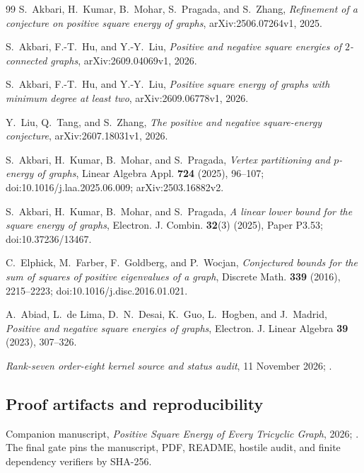 \documentclass[11pt]{article}
\theoremstyle{remark}
\begin{document}
\begin{thebibliography}{99}
S.~Akbari, H.~Kumar, B.~Mohar, S.~Pragada, and S.~Zhang,
\emph{Refinement of a conjecture on positive square energy of graphs},
arXiv:2506.07264v1, 2025.

S.~Akbari, F.-T.~Hu, and Y.-Y.~Liu,
\emph{Positive and negative square energies of $2$-connected graphs},
arXiv:2609.04069v1, 2026.

S.~Akbari, F.-T.~Hu, and Y.-Y.~Liu,
\emph{Positive square energy of graphs with minimum degree at least two},
arXiv:2609.06778v1, 2026.

Y.~Liu, Q.~Tang, and S.~Zhang,
\emph{The positive and negative square-energy conjecture},
arXiv:2607.18031v1, 2026.

S.~Akbari, H.~Kumar, B.~Mohar, and S.~Pragada,
\emph{Vertex partitioning and $p$-energy of graphs},
Linear Algebra Appl. \textbf{724} (2025), 96--107;
doi:10.1016/j.laa.2025.06.009; arXiv:2503.16882v2.

S.~Akbari, H.~Kumar, B.~Mohar, and S.~Pragada,
\emph{A linear lower bound for the square energy of graphs},
Electron. J. Combin. \textbf{32}(3) (2025), Paper P3.53;
doi:10.37236/13467.

C.~Elphick, M.~Farber, F.~Goldberg, and P.~Wocjan,
\emph{Conjectured bounds for the sum of squares of positive eigenvalues of a
graph}, Discrete Math. \textbf{339} (2016), 2215--2223;
doi:10.1016/j.disc.2016.01.021.

A.~Abiad, L.~de Lima, D.~N.~Desai, K.~Guo, L.~Hogben, and J.~Madrid,
\emph{Positive and negative square energies of graphs},
Electron. J. Linear Algebra \textbf{39} (2023), 307--326.

\emph{Rank-seven order-eight kernel source and status audit}, 11 November 2026;
.

\subsection*{Proof artifacts and reproducibility}

Companion manuscript, \emph{Positive Square Energy of Every Tricyclic Graph},
2026; .  The final gate pins the
manuscript, PDF, README, hostile audit, and finite dependency verifiers by
SHA-256.


\end{thebibliography}
\end{document}
